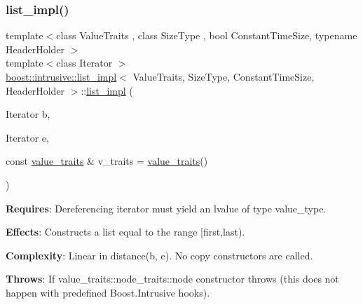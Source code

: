 \subsubsection{\texorpdfstring{list\+\_\+impl()}{list\_impl()}\hspace{0.1cm}{\footnotesize\ttfamily [3/4]}}
{\footnotesize\ttfamily template$<$class Value\+Traits , class Size\+Type , bool Constant\+Time\+Size, typename Header\+Holder $>$ \\
template$<$class Iterator $>$ \\
\hyperlink{classboost_1_1intrusive_1_1list__impl}{boost\+::intrusive\+::list\+\_\+impl}$<$ Value\+Traits, Size\+Type, Constant\+Time\+Size, Header\+Holder $>$\+::\hyperlink{classboost_1_1intrusive_1_1list__impl}{list\+\_\+impl} (\begin{DoxyParamCaption}\item[{Iterator}]{b,  }\item[{Iterator}]{e,  }\item[{const \hyperlink{classboost_1_1intrusive_1_1list__impl_a5cd55672f6df367749d91ef708834126}{value\+\_\+traits} \&}]{v\+\_\+traits = {\ttfamily \hyperlink{classboost_1_1intrusive_1_1list__impl_a5cd55672f6df367749d91ef708834126}{value\+\_\+traits}()} }\end{DoxyParamCaption})\hspace{0.3cm}{\ttfamily [inline]}}

{\bfseries Requires}\+: Dereferencing iterator must yield an lvalue of type value\+\_\+type.

{\bfseries Effects}\+: Constructs a list equal to the range \mbox{[}first,last).

{\bfseries Complexity}\+: Linear in distance(b, e). No copy constructors are called.

{\bfseries Throws}\+: If value\+\_\+traits\+::node\+\_\+traits\+::node constructor throws (this does not happen with predefined Boost.\+Intrusive hooks). \mbox{\label{classboost_1_1intrusive_1_1list__impl_af87baafc7d3c1ada9da405928dd7d59a}} 
